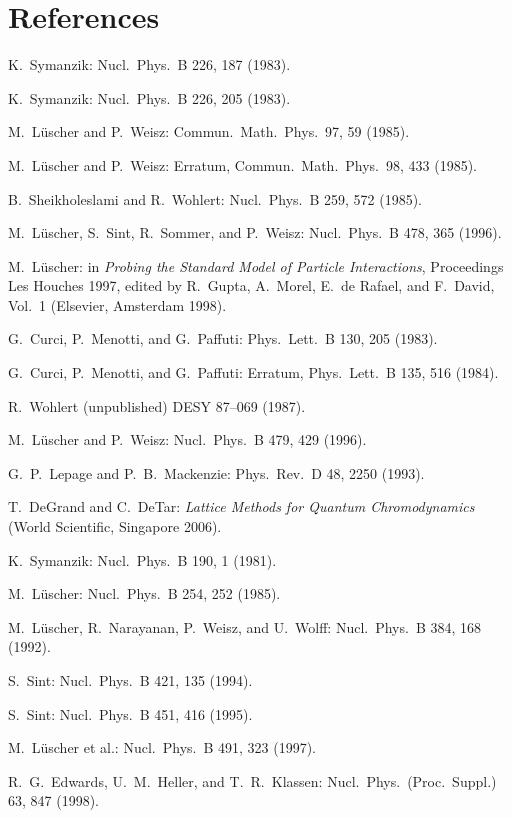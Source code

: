 \section*{References}

\begin{enumerate}[label={[\arabic*]}]
  \item K.~Symanzik: Nucl.\ Phys.\ B 226, 187 (1983).
  \item K.~Symanzik: Nucl.\ Phys.\ B 226, 205 (1983).
  \item M.~L\"uscher and P.~Weisz: Commun.\ Math.\ Phys.\ 97, 59 (1985).
  \item M.~L\"uscher and P.~Weisz: Erratum, Commun.\ Math.\ Phys.\ 98, 433 (1985).
  \item B.~Sheikholeslami and R.~Wohlert: Nucl.\ Phys.\ B 259, 572 (1985).
  \item M.~L\"uscher, S.~Sint, R.~Sommer, and P.~Weisz: Nucl.\ Phys.\ B 478, 365 (1996).
  \item M.~L\"uscher: in \emph{Probing the Standard Model of Particle
        Interactions}, Proceedings Les Houches 1997, edited by R.~Gupta,
        A.~Morel, E.~de Rafael, and F.~David, Vol.~1 (Elsevier, Amsterdam
        1998).
  \item G.~Curci, P.~Menotti, and G.~Paffuti: Phys.\ Lett.\ B 130, 205 (1983).
  \item G.~Curci, P.~Menotti, and G.~Paffuti: Erratum, Phys.\ Lett.\ B 135, 516 (1984).
  \item R.~Wohlert (unpublished) DESY 87--069 (1987).
  \item M.~L\"uscher and P.~Weisz: Nucl.\ Phys.\ B 479, 429 (1996).
  \item G.~P.~Lepage and P.~B.~Mackenzie: Phys.\ Rev.\ D 48, 2250 (1993).
  \item T.~DeGrand and C.~DeTar: \emph{Lattice Methods for Quantum
        Chromodynamics} (World Scientific, Singapore 2006).
  \item K.~Symanzik: Nucl.\ Phys.\ B 190, 1 (1981).
  \item M.~L\"uscher: Nucl.\ Phys.\ B 254, 252 (1985).
  \item M.~L\"uscher, R.~Narayanan, P.~Weisz, and U.~Wolff: Nucl.\ Phys.\ B 384, 168 (1992).
  \item S.~Sint: Nucl.\ Phys.\ B 421, 135 (1994).
  \item S.~Sint: Nucl.\ Phys.\ B 451, 416 (1995).
  \item M.~L\"uscher et al.: Nucl.\ Phys.\ B 491, 323 (1997).
  \item R.~G.~Edwards, U.~M.~Heller, and T.~R.~Klassen: Nucl.\ Phys.\ (Proc.\ Suppl.) 63, 847 (1998).

\end{enumerate}
